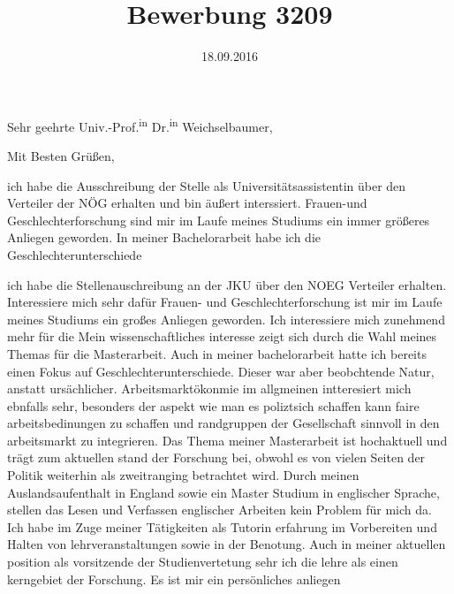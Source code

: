 \documentclass[11pt,a4paper,sans]{moderncv}
\title{Bewerbung 3209}\address{Obere Ried 9}{1220 Wien}
\begin{document}
\date{18.09.2016}
\opening{ Sehr geehrte Univ.-Prof.\textsuperscript{in} Dr.\textsuperscript{in} Weichselbaumer,}
\closing{Mit Besten Grüßen,}
\makelettertitle
\justify
ich habe die Ausschreibung der Stelle als Universitätsassistentin über den Verteiler der NÖG erhalten und bin äußert interssiert.
Frauen-und Geschlechterforschung sind mir im Laufe meines Studiums ein immer größeres Anliegen geworden. In meiner Bachelorarbeit habe ich die Geschlechterunterschiede 

ich habe die Stellenauschreibung an der JKU über den NOEG Verteiler erhalten. 
Interessiere mich sehr dafür
Frauen- und Geschlechterforschung ist mir im Laufe meines Studiums ein großes Anliegen geworden. Ich interessiere mich zunehmend mehr für die 
Mein wissenschaftliches interesse zeigt sich durch die Wahl meines Themas für die Masterarbeit. Auch in meiner bachelorarbeit hatte ich bereits einen Fokus auf Geschlechterunterschiede. Dieser war aber beobchtende Natur, anstatt ursächlicher. Arbeitsmarktökonmie im allgmeinen intteresiert mich ebnfalls sehr, besonders der aspekt wie man es poliztsich schaffen kann faire arbeitsbedinungen zu schaffen und randgruppen der Gesellschaft sinnvoll in den arbeitsmarkt zu integrieren. 
Das Thema meiner Masterarbeit ist hochaktuell und trägt zum aktuellen stand der Forschung bei, obwohl es von vielen Seiten der Politik weiterhin als zweitranging betrachtet wird. 
Durch meinen Auslandsaufenthalt in England sowie ein Master Studium in englischer Sprache, stellen das Lesen und Verfassen englischer Arbeiten kein Problem für mich da. 
Ich habe im Zuge meiner Tätigkeiten als Tutorin erfahrung im Vorbereiten und Halten von lehrveranstaltungen sowie in der Benotung. Auch in meiner aktuellen position als vorsitzende der Studienvertetung sehr ich die lehre als einen kerngebiet der Forschung. Es ist mir ein persönliches anliegen


\makeletterclosing

\clearpage                           %
\end{document}
